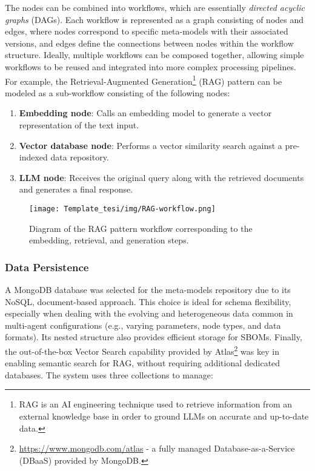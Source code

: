 The nodes can be combined into workflows, which are essentially \textit{directed acyclic graphs} (DAGs). Each workflow is represented as a graph consisting of nodes and edges, where nodes correspond to specific meta-models with their associated versions, and edges define the connections between nodes within the workflow structure.
Ideally, multiple workflows can be composed together, allowing simple workflows to be reused and integrated into more complex processing pipelines. For example, the Retrieval-Augmented Generation\footnote{RAG is an AI engineering technique used to retrieve information from an external knowledge base in order to ground LLMs on accurate and up-to-date data.} (RAG) pattern can be modeled as a sub-workflow consisting of the following nodes:

\begin{enumerate}[leftmargin=*, label=\textbf{\arabic*.}]
    \item \textbf{Embedding node}: Calls an embedding model to generate a vector representation of the text input.
    \item \textbf{Vector database node}: Performs a vector similarity search against a pre-indexed data repository.
    \item \textbf{LLM node}: Receives the original query along with the retrieved documents and generates a final response.
\end{enumerate}


\begin{figure}[h]
    \centering
    \texttt{[image: Template\_tesi/img/RAG-workflow.png]}
    \caption{Diagram of the RAG pattern workflow corresponding to the embedding, retrieval, and generation steps.}
    \label{fig:RAG-workflow}
\end{figure}










\subsubsection{Data Persistence}

A MongoDB database was selected for the meta-models repository due to its NoSQL, document-based approach. This choice is ideal for schema flexibility, especially when dealing with the evolving and heterogeneous data common in multi-agent configurations (e.g., varying parameters, node types, and data formats). Its nested structure also provides efficient storage for SBOMs. Finally, the out-of-the-box Vector Search capability provided by Atlas\footnote{\url{https://www.mongodb.com/atlas} - a fully managed Database-as-a-Service (DBaaS) provided by MongoDB.} was key in enabling semantic search for RAG, without requiring additional dedicated databases. The system uses three collections to manage:

